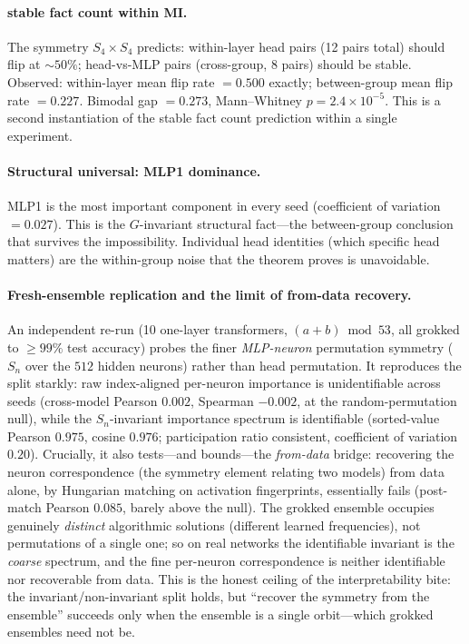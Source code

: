 \documentclass[11pt,a4paper]{article}
\begin{document}
\paragraph{stable fact count within MI.}
The symmetry $S_4 \times S_4$ predicts: within-layer head pairs (12 pairs total) should flip at $\sim 50\%$; head-vs-MLP pairs (cross-group, 8 pairs) should be stable.  Observed: within-layer mean flip rate $= 0.500$ exactly; between-group mean flip rate $= 0.227$.  Bimodal gap $= 0.273$, Mann--Whitney $p = 2.4 \times 10^{-5}$.  This is a second instantiation of the stable fact count prediction within a single experiment.

\paragraph{Structural universal: MLP1 dominance.}
MLP1 is the most important component in every seed (coefficient of variation $= 0.027$).  This is the $G$-invariant structural fact---the between-group conclusion that survives the impossibility.  Individual head identities (which specific head matters) are the within-group noise that the theorem proves is unavoidable.

\paragraph{Fresh-ensemble replication and the limit of from-data recovery.}
An independent re-run (10 one-layer transformers, $(a+b)\bmod 53$, all grokked to $\geq 99\%$ test accuracy) probes the finer \emph{MLP-neuron} permutation symmetry ($S_n$ over the $512$ hidden neurons) rather than head permutation.  It reproduces the split starkly: raw index-aligned per-neuron importance is unidentifiable across seeds (cross-model Pearson $0.002$, Spearman $-0.002$, at the random-permutation null), while the $S_n$-invariant importance spectrum is identifiable (sorted-value Pearson $0.975$, cosine $0.976$; participation ratio consistent, coefficient of variation $0.20$).  Crucially, it also tests---and bounds---the \emph{from-data} bridge: recovering the neuron correspondence (the symmetry element relating two models) from data alone, by Hungarian matching on activation fingerprints, essentially fails (post-match Pearson $0.085$, barely above the null).  The grokked ensemble occupies genuinely \emph{distinct} algorithmic solutions (different learned frequencies), not permutations of a single one; so on real networks the identifiable invariant is the \emph{coarse} spectrum, and the fine per-neuron correspondence is neither identifiable nor recoverable from data.  This is the honest ceiling of the interpretability bite: the invariant/non-invariant split holds, but ``recover the symmetry from the ensemble'' succeeds only when the ensemble is a single orbit---which grokked ensembles need not be.
\end{document}
